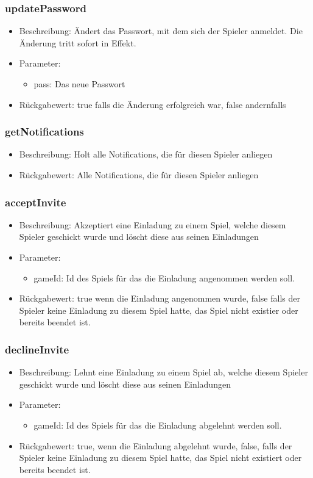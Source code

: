 \documentclass[a4paper]{scrreprt}
\begin{document}
	\subsubsection{updatePassword}
	\begin{itemize}
		\item Beschreibung: Ändert das Passwort, mit dem sich der Spieler anmeldet. Die Änderung tritt sofort in Effekt.
		\item Parameter:
		\begin{itemize}
			\item pass: Das neue Passwort
		\end{itemize}
		\item Rückgabewert: true falls die Änderung erfolgreich war, false andernfalls
	\end{itemize}
	\subsubsection{getNotifications}
	\begin{itemize}
		\item Beschreibung: Holt alle Notifications, die für diesen Spieler anliegen
		\item Rückgabewert:  Alle Notifications, die für diesen Spieler anliegen
	\end{itemize}
	\subsubsection{acceptInvite}
	\begin{itemize}
		\item Beschreibung: Akzeptiert eine Einladung zu einem Spiel, welche diesem Spieler geschickt wurde und löscht diese aus seinen Einladungen
		\item Parameter:
		\begin{itemize}
			\item gameId: Id des Spiels für das die Einladung angenommen werden soll.
		\end{itemize}
		\item Rückgabewert: true wenn die Einladung angenommen wurde, false falls der Spieler keine Einladung zu diesem Spiel hatte, das Spiel nicht existier oder bereits beendet ist.
	\end{itemize}
	\subsubsection{declineInvite}
	\begin{itemize}
		\item Beschreibung: Lehnt eine Einladung zu einem Spiel ab, welche diesem Spieler geschickt wurde und löscht diese aus seinen Einladungen
		\item Parameter:
		\begin{itemize}
			\item gameId: Id des Spiels für das die Einladung abgelehnt werden soll.
		\end{itemize}
		\item Rückgabewert: true, wenn die Einladung abgelehnt wurde, false, falls der Spieler keine Einladung zu diesem Spiel hatte, das Spiel nicht existiert oder bereits beendet ist.
	\end{itemize}
\end{document}
